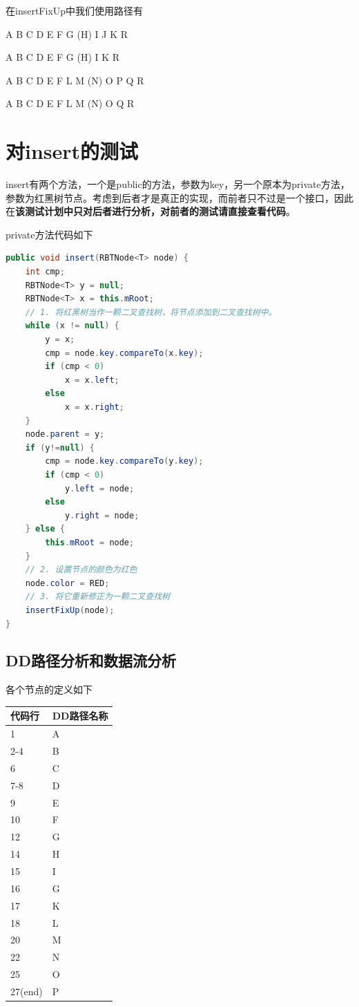 \documentclass[12pt, a4paper, oneside]{ctexart}
\begin{document}
在insertFixUp中我们使用路径有

A B C D E F G (H) I J K R

A B C D E F G (H) I K R

A B C D E F L M (N) O P Q R

A B C D E F L M (N) O Q R

\section{对insert的测试}

insert有两个方法，一个是public的方法，参数为key，另一个原本为private方法，参数为红黑树节点。考虑到后者才是真正的实现，而前者只不过是一个接口，因此在\textbf{该测试计划中只对后者进行分析，对前者的测试请直接查看代码}。

private方法代码如下

\begin{lstlisting}[language=Java]
public void insert(RBTNode<T> node) {
    int cmp;
    RBTNode<T> y = null;
    RBTNode<T> x = this.mRoot;
    // 1. 将红黑树当作一颗二叉查找树，将节点添加到二叉查找树中。
    while (x != null) {
        y = x;
        cmp = node.key.compareTo(x.key);
        if (cmp < 0)
            x = x.left;
        else
            x = x.right;
    }
    node.parent = y;
    if (y!=null) {
        cmp = node.key.compareTo(y.key);
        if (cmp < 0)
            y.left = node;
        else
            y.right = node;
    } else {
        this.mRoot = node;
    }
    // 2. 设置节点的颜色为红色
    node.color = RED;
    // 3. 将它重新修正为一颗二叉查找树
    insertFixUp(node);
}
\end{lstlisting}
\subsection{DD路径分析和数据流分析}
各个节点的定义如下
\begin{table}[!h]
    \begin{tabular}{|l|l|}
        \hline
        代码行 & DD路径名称 \\ \hline
        1 & A \\ \hline
        2-4 & B \\ \hline
        6 & C \\ \hline
        7-8 & D \\ \hline
        9 & E \\ \hline
        10 & F \\ \hline
        12 & G \\ \hline
        14 & H \\ \hline
        15 & I \\ \hline
        16& G \\ \hline
        17 & K \\ \hline
        18 & L \\ \hline
        20 & M \\ \hline
        22 & N \\ \hline
        25 & O \\ \hline
        27(end) & P \\ \hline
    \end{tabular}
    
\end{table}
\end{document}
